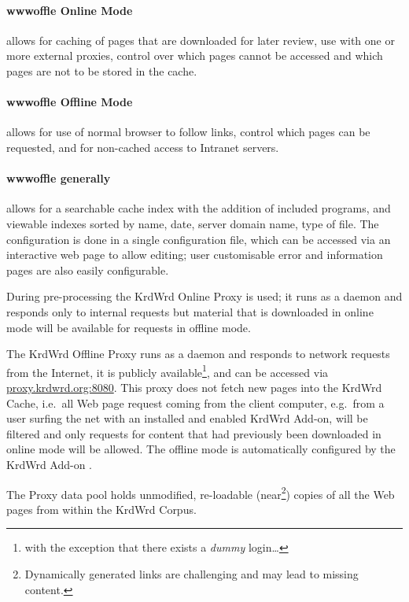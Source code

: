 \begin{longversion}
\paragraph{wwwoffle Online Mode} allows for 
caching of pages that are downloaded for later review, 
use with one or more external proxies, 
control over which pages cannot be accessed and 
which pages are not to be stored in the cache.

\paragraph{wwwoffle Offline Mode} allows for
use of normal browser to follow links,
control which pages can be requested, and
for non-cached access to Intranet servers. 

\paragraph{wwwoffle generally} allows for a
searchable cache index with the addition of included programs, and
viewable indexes sorted by name, date, server domain name, type of file.
The configuration is done in a single configuration file, which can be accessed via an interactive web page to allow editing; user customisable error and information pages are also easily configurable. 

\noindent\linebreak
During pre-processing the KrdWrd Online Proxy is used; it runs as a daemon and responds only to internal requests but material that is downloaded in online mode will be available for requests in offline mode.

The KrdWrd Offline Proxy runs as a daemon and responds to network requests from the Internet, it is publicly available\footnote{with the exception that there exists a \emph{dummy} login\ldots}, and can be accessed via \url{proxy.krdwrd.org:8080}. 
This proxy does not fetch new pages into the KrdWrd Cache, i.e.~all Web page request coming from the client computer, e.g.~from a user surfing the net with an installed and enabled KrdWrd Add-on, will be filtered and only requests for content that had previously been downloaded in online mode will be allowed. 
The offline mode is automatically configured by the KrdWrd Add-on .

The Proxy data pool holds unmodified, re-loadable (near\footnote{Dynamically generated links are challenging and may lead to missing content.}) copies of all the Web pages from within the KrdWrd Corpus. 


\end{longversion}
